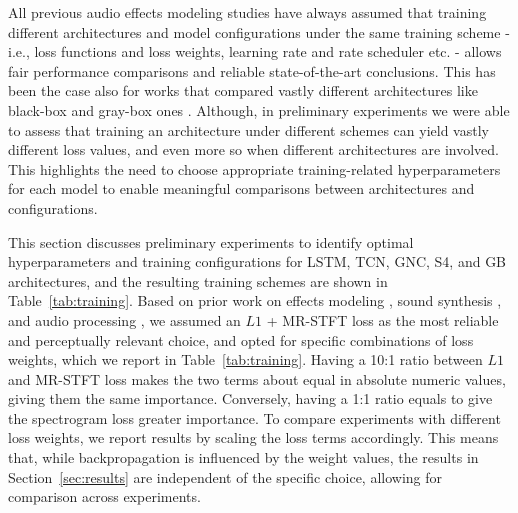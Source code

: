 All previous audio effects modeling studies have always assumed that training different architectures and model configurations under the same training scheme - i.e., loss functions and loss weights, learning rate and rate scheduler etc. - allows fair performance comparisons and reliable state-of-the-art conclusions.
This has been the case also for works that compared vastly different architectures like black-box and gray-box ones 
\citep{yeh2024ddsp, miklanek2023neural, wright2022grey}.
Although, in preliminary experiments we were able to assess that training an architecture under different schemes can yield vastly different loss values, and even more so when different architectures are involved.
This highlights the need to choose appropriate training-related hyperparameters for each model to enable meaningful comparisons between architectures and configurations.

This section discusses preliminary experiments to identify optimal hyperparameters and training configurations for LSTM, TCN, GNC, S4, and GB architectures, and the resulting training schemes are shown in Table~\ref{tab:training}.
Based on prior work on effects modeling \cite{steinmetz2022efficient, comunita2023modelling}, sound synthesis \cite{engel2019ddsp}, and audio processing \citep{yamamoto2020parallel}, we assumed an $L1$ + MR-STFT loss as the most reliable and perceptually relevant choice, and opted for specific combinations of loss weights, which we report in Table~\ref{tab:training}.
Having a 10:1 ratio between $L1$ and MR-STFT loss makes the two terms about equal in absolute numeric values, giving them the same importance.
Conversely, having a 1:1 ratio equals to give the spectrogram loss greater importance.
To compare experiments with different loss weights, we report results by scaling the loss terms accordingly.
This means that, while backpropagation is influenced by the weight values, the results in Section~\ref{sec:results} are independent of the specific choice, allowing for comparison across experiments.

